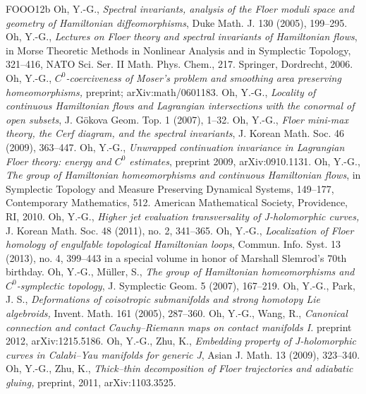 \begin{thebibliography}{FOOO12b}
 Oh, Y.-G., \textit{Spectral invariants, analysis of the Floer moduli space and geometry of Hamiltonian diffeomorphisms}, Duke Math. J. 130 (2005), 199--295.
 Oh, Y.-G., \textit{Lectures on Floer theory and spectral invariants of Hamiltonian flows}, in Morse Theoretic Methods in Nonlinear Analysis and in Symplectic Topology, 321--416, NATO Sci. Ser. II Math. Phys. Chem., 217. Springer, Dordrecht, 2006.
 Oh, Y.-G., \textit{$C^0$-coerciveness of Moser\textquoteright{}s problem and smoothing area preserving homeomorphisms,} preprint; arXiv:math/0601183.
 Oh, Y.-G., \textit{Locality of continuous Hamiltonian flows and Lagrangian intersections with the conormal of open subsets}, J. Gökova Geom. Top. 1 (2007), 1--32.
 Oh, Y.-G., \textit{Floer mini-max theory, the Cerf diagram, and the spectral invariants}, J. Korean Math. Soc. 46 (2009), 363--447.
 Oh, Y.-G., \textit{Unwrapped continuation invariance in Lagrangian Floer theory: energy and $C^0$ estimates}, preprint 2009, arXiv:0910.1131.
 Oh, Y.-G., \textit{The group of Hamiltonian homeomorphisms and continuous Hamiltonian flows}, in Symplectic Topology and Measure Preserving Dynamical Systems, 149--177, Contemporary Mathematics, 512. American Mathematical Society, Providence, RI, 2010.
 Oh, Y.-G., \textit{Higher jet evaluation transversality of J-holomorphic curves,} J. Korean Math. Soc. 48 (2011), no. 2, 341--365.
 Oh, Y.-G., \textit{Localization of Floer homology of engulfable topological Hamiltonian loops}, Commun. Info. Syst. 13 (2013), no. 4, 399--443 in a special volume in honor of Marshall Slemrod\textquoteright{}s 70th birthday.
 Oh, Y.-G., Müller, S., \textit{The group of Hamiltonian homeomorphisms and $C^0$-symplectic topology}, J. Symplectic Geom. 5 (2007), 167--219.
 Oh, Y.-G., Park, J. S., \textit{Deformations of coisotropic submanifolds and strong homotopy Lie algebroids,} Invent. Math. 161 (2005), 287--360.
 Oh, Y.-G., Wang, R., \textit{Canonical connection and contact Cauchy--Riemann maps on contact manifolds I.} preprint 2012, arXiv:1215.5186.
 Oh, Y.-G., Zhu, K., \textit{Embedding property of J-holomorphic curves in Calabi--Yau manifolds for generic J}, Asian J. Math. 13 (2009), 323--340.
 Oh, Y.-G., Zhu, K., \textit{Thick--thin decomposition of Floer trajectories and adiabatic gluing,} preprint, 2011, arXiv:1103.3525.

\end{thebibliography}
